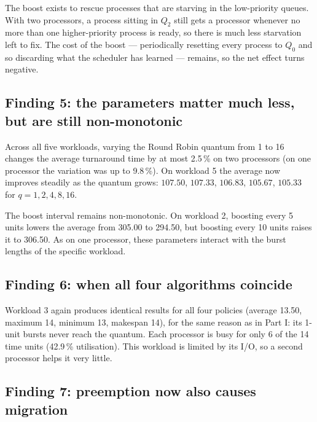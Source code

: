 \documentclass[11pt,a4paper]{article}
\begin{document}
The boost exists to rescue processes that are starving in the low-priority queues. With two
processors, a process sitting in $Q_2$ still gets a processor whenever no more than one
higher-priority process is ready, so there is much less starvation left to fix. The cost of the boost ---
periodically resetting every process to $Q_0$ and so discarding what the scheduler has
learned --- remains, so the net effect turns negative.

\subsection{Finding 5: the parameters matter much less, but are still non-monotonic}

Across all five workloads, varying the Round Robin quantum from 1 to 16 changes the average
turnaround time by at most 2.5\,\% on two processors (on one processor the variation was
up to 9.8\,\%). On workload 5 the average now improves steadily as the quantum grows:
$107.50$, $107.33$, $106.83$, $105.67$, $105.33$ for $q=1,2,4,8,16$.

The boost interval remains non-monotonic. On workload 2, boosting every 5 units lowers the
average from 305.00 to 294.50, but boosting every 10 units raises it to 306.50. As on one processor,
these parameters interact with the burst lengths of the specific workload.

\subsection{Finding 6: when all four algorithms coincide}

Workload 3 again produces identical results for all four policies (average 13.50, maximum
14, minimum 13, makespan 14), for the same reason as in Part I: its 1-unit bursts never
reach the quantum. Each processor is busy for only 6 of the 14 time units (42.9\,\%
utilisation). This workload is limited by its I/O, so a second processor helps it very
little.

\subsection{Finding 7: preemption now also causes migration}
\end{document}
